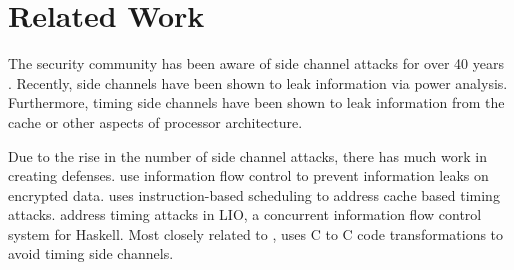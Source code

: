 \section{Related Work}
\label{sec:related}

The security community has been aware of side channel attacks for over 40 years
\cite{lampson1973, wray1991, lipner1975, brumley2005remote}. Recently, side channels have been
shown to leak information via power analysis\cite{Vaudenay2016}. Furthermore,
timing side channels have been shown to leak information from the
cache\cite{liu2015} or other aspects of processor architecture\cite{wang2004}.

Due to the rise in the number of side channel attacks, there has much work
in creating defenses. \cite{planul2013,mitchell2012} use information flow control
to prevent information leaks on encrypted data. \cite{stefan2013} uses
instruction-based scheduling to address cache based timing attacks.
\cite{stefan2012,buiras2014} address timing attacks in LIO, a concurrent
information flow control system for Haskell. Most closely related to \constc,
\cite{molnar2005} uses C to C code transformations to avoid timing side
channels.
